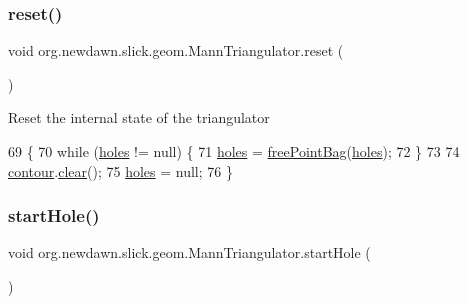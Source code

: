 \subsubsection{\texorpdfstring{reset()}{reset()}}
{\footnotesize\ttfamily void org.\+newdawn.\+slick.\+geom.\+Mann\+Triangulator.\+reset (\begin{DoxyParamCaption}{ }\end{DoxyParamCaption})\hspace{0.3cm}{\ttfamily [inline]}}

Reset the internal state of the triangulator 
\begin{DoxyCode}
69                         \{
70         \textcolor{keywordflow}{while} (\mbox{\hyperlink{classorg_1_1newdawn_1_1slick_1_1geom_1_1_mann_triangulator_a52a9b8b72ebce44c620dbad2e8285540}{holes}} != null) \{
71             \mbox{\hyperlink{classorg_1_1newdawn_1_1slick_1_1geom_1_1_mann_triangulator_a52a9b8b72ebce44c620dbad2e8285540}{holes}} = \mbox{\hyperlink{classorg_1_1newdawn_1_1slick_1_1geom_1_1_mann_triangulator_af2f8f368371dd9ef7588356127aaad05}{freePointBag}}(\mbox{\hyperlink{classorg_1_1newdawn_1_1slick_1_1geom_1_1_mann_triangulator_a52a9b8b72ebce44c620dbad2e8285540}{holes}});
72         \}
73 
74         \mbox{\hyperlink{classorg_1_1newdawn_1_1slick_1_1geom_1_1_mann_triangulator_a94eff0c5ad39ce0c232815591fe3f2d8}{contour}}.\mbox{\hyperlink{classorg_1_1newdawn_1_1slick_1_1geom_1_1_mann_triangulator_1_1_point_bag_a5c4e5b96ea8667ed723478412b412d3c}{clear}}();
75         \mbox{\hyperlink{classorg_1_1newdawn_1_1slick_1_1geom_1_1_mann_triangulator_a52a9b8b72ebce44c620dbad2e8285540}{holes}} = null;
76     \}
\end{DoxyCode}
\mbox{\label{classorg_1_1newdawn_1_1slick_1_1geom_1_1_mann_triangulator_a86359f375402b39594c6f2c7a7b46290}} 
\subsubsection{\texorpdfstring{start\+Hole()}{startHole()}}
{\footnotesize\ttfamily void org.\+newdawn.\+slick.\+geom.\+Mann\+Triangulator.\+start\+Hole (\begin{DoxyParamCaption}{ }\end{DoxyParamCaption})\hspace{0.3cm}{\ttfamily [inline]}}

